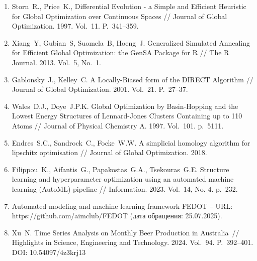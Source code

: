 \documentclass[a4paper,12pt,russian]{article}
\begin{document}
\begin{enumerate}
\item \label{rfa:rulit:differential_evolution}
Storn~R., Price~K., Differential Evolution - a Simple and Efficient Heuristic for Global Optimization over Continuous Spaces //
Journal of Global Optimization. 1997. Vol.~11. P.~341--359.

\item \label{rfa:rulit:dual_annealing}
Xiang~Y, Gubian~S, Suomela~B, Hoeng~J. Generalized Simulated Annealing for Efficient Global Optimization: the GenSA Package for R // The R Journal. 2013. Vol.~5, No.~1.

\item \label{rfa:rulit:direct}
Gablonsky~J., Kelley~C. A Locally-Biased form of the DIRECT Algorithm // Journal of Global Optimization. 2001. Vol.~21. P.~27--37.

\item \label{rfa:rulit:basinhopping}
Wales~D.J., Doye~J.P.K. Global Optimization by Basin-Hopping and the Lowest Energy Structures of Lennard-Jones Clusters Containing up to 110 Atoms // Journal of Physical Chemistry A. 1997. Vol.~101. p.~5111.

\item \label{rfa:rulit:shgo}
Endres~S.C., Sandrock~C., Focke~W.W. A simplicial homology algorithm for lipschitz optimisation // Journal of Global Optimization. 2018.


\item \label{rfa:rulit:nikitin2022automated}
Filippou~K., Aifantis~G., Papakostas~G.A., Tsekouras~G.E. Structure learning and hy\-per\-pa\-ra\-me\-ter optimization using an automated machine learning ({AutoML}) pipeline // Information. 2023. Vol.~14, No. 4. p.~232.

\item \label{rfa:rulit:fedot}
Automated modeling and machine learning framework {FEDOT} -- URL: \\https://github.com/aimclub/FEDOT (дата обращения: 25.07.2025).

\item \label{rfa:rulit:MonthlyBeerArticle}
Xu~N. Time Series Analysis on Monthly Beer Production in Australia~// Highlights in Science, Engineering and Technology. 2024. Vol.~94. P.~392--401. DOI: 10.54097/4z3krj13




\end{enumerate}
\end{document}
